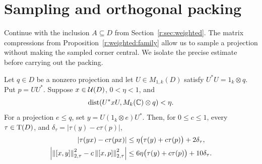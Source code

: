 \section{Sampling and orthogonal packing}\label{r:sec:packing}

Continue with the inclusion \(A\subseteq D\) from
Section~\ref{r:sec:weighted}. The matrix compressions from
Proposition~\ref{r:weighted:family} allow
us to sample a projection without making the sampled corner central.
We isolate the precise estimate before carrying out the packing.

\begin{lemma}\label{r:packing:sampling}
Let \(q\in D\) be a nonzero projection and let \(U\in M_{1,k}(D)\)
satisfy \(U^*U=1_k\otimes q\). Put \(p=UU^*\).
Suppose \(x\in\mathcal U(D)\), \(0<\eta<1\), and
\[
 \operatorname{dist}(U^*xU,M_k(\mathbb C)\otimes q)<\eta.
\]
For a projection \(e\leq q\), set \(y=U(1_k\otimes e)U^*\).
Then, for \(0\leq c\leq1\), every \(\tau\in\operatorname T(D)\), and
\(\delta_\tau=|\tau(y)-c\tau(p)|\),
\begin{align}
 |\tau(yx)-c\tau(px)|
 &\leq\eta\big(\tau(y)+c\tau(p)\big)+2\delta_\tau,
 \label{r:eq:sampling-linear}\\
 \left|\left\|[x,y]\right\|_{2,\tau}^2
        -c\left\|[x,p]\right\|_{2,\tau}^2\right|
 &\leq6\eta\big(\tau(y)+c\tau(p)\big)+10\delta_\tau.
 \label{r:eq:sampling-energy}
\end{align}
\end{lemma}

